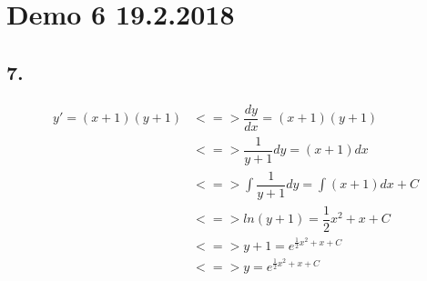 \section{Demo 6 19.2.2018}




\subsection{7.}
\begin{center}
\begin{align*}
	y' = (x + 1)(y + 1) &<=> \dfrac{dy}{dx} = (x + 1)(y + 1) \\
						&<=> \dfrac{1}{y+1} dy = (x+1) dx \\
						&<=> \int \dfrac{1}{y+1}dy = \int (x+1) dx + C \\
						&<=> ln(y+1) = \dfrac{1}{2}x^2 + x + C \\
						&<=> y+1 = e^{\frac{1}{2} x^2 + x + C} \\
						&<=> y = e^{\frac{1}{2} x^2 + x + C}
\end{align*}
\end{center}